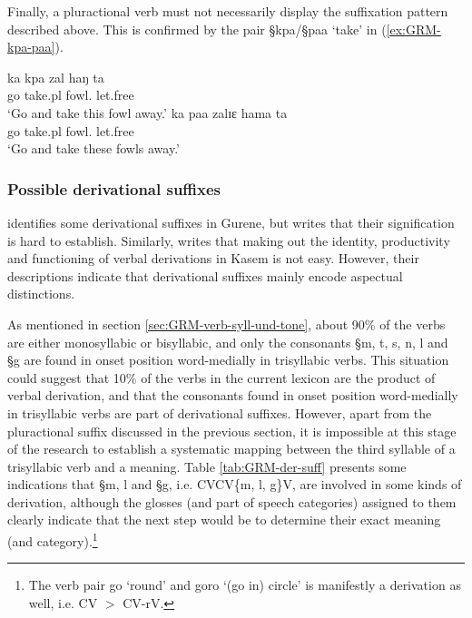 Finally, a pluractional verb must not necessarily display the
suffixation pattern
described above. This is confirmed by the pair {\S kpa}/{\S paa} `take'  in
(\ref{ex:GRM-kpa-paa}).

\begin{exe}
    \ex\label{ex:GRM-kpa-paa}
  \begin{xlist}
    \ex\label{ex:GRM-kpa}
\gll ka kpa zal haŋ ta\\
go take.{\sc pl} fowl.{\sg} {\dem} let.free\\
\glt `Go and take this fowl away.'
      \ex\label{ex:GRM-paa}
\gll ka paa zalɪɛ hama ta\\
go take.{\sc pl} fowl.{\pl} {\dem} let.free\\
\glt `Go and take these fowls away.'
 \end{xlist}
\end{exe}



\subsubsection{Possible derivational suffixes}
\label{sec:GRM-deri-suff}

 \citet[37]{Daku09} identifies some derivational suffixes in
Gurene, but writes that their signification is hard to establish. Similarly,
\citet[69]{Bonv88} writes that making out the identity, productivity and
functioning of verbal derivations in Kasem is not easy. However,
their descriptions indicate that  derivational suffixes mainly encode aspectual
distinctions.

As mentioned in section \ref{sec:GRM-verb-syll-und-tone}, about 90\% of the
verbs are either monosyllabic or bisyllabic, and  only the consonants {\S m,
t, s, n,  l} and {\S g} are found  in onset position word-medially in
trisyllabic verbs. This situation could suggest that 10\% of the verbs in the
current lexicon are the product of verbal derivation, and that the consonants
found  in onset position word-medially in trisyllabic verbs are part of
derivational suffixes. However, apart from the pluractional suffix discussed in
the previous section,  it is impossible at this stage of the research to
establish a systematic mapping between the third syllable of a trisyllabic verb
and a meaning. Table \ref{tab:GRM-der-suff}
presents  some indications that {\S m, l} and {\S g}, i.e. CVCV\{m, l, g\}V,
are involved in some kinds of derivation, although the glosses (and part of
speech categories) assigned to them clearly indicate that the next step would be
to determine their exact meaning (and category).\footnote{The verb pair {\F
go} `round'  and {\F goro}  `(go in) circle'  is  manifestly a derivation as
well, i.e.
CV $>$ CV-rV.} 



